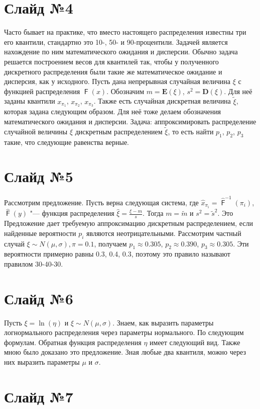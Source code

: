 \documentclass[specialist, substylefile = spbu.rtx,
subf,href,colorlinks=true, 12pt]{disser}
\DeclareMathOperator{\F}{\mathsf{F}}
\begin{document}
	\section*{Слайд №4}
Часто бывает на практике, что вместо настоящего распределения известны три его квантили, стандартно это 10-, 50- и 90-процентили. Задачей является нахождение по ним математического ожидания и дисперсии. Обычно задача решается построением весов для квантилей так, чтобы у полученного дискретного распределения были такие же математическое ожидание и дисперсия, как у исходного. Пусть дана непрерывная случайная величина $\xi$ с функцией распределения $\F(x)$. Обозначим $m = \mathbf E(\xi)$, $s^{2} = \mathbf D(\xi)$.
Для неё заданы квантили $x_{\pi_{1}}$, $x_{\pi_{2}}$, $x_{\pi_{3}}$. Также есть случайная дискретная величина $\tilde{\xi}$, которая задана следующим образом.
Для неё тоже делаем обозначения математического ожидания и дисперсии.
Задача: аппроксимировать распределение случайной величины $\xi$ дискретным распределением $\tilde{\xi}$, то есть найти $p_{1}$, $p_{2}$, $p_{3}$ такие, что следующие равенства верные.

\section*{Слайд №5}
Рассмотрим предложение. Пусть верна следующая система, где $\hat{x}_{\pi_{i}} = \hat{\F}^{-1}(\pi_{i})$, $\hat{\F}(y)$ "--- функция распределения $\displaystyle{\hat{\xi} = \frac{\xi-m}{s}}$. Тогда $m=\tilde{m}$ и $s^{2} = \tilde{s}^{2}$. Это Предложение дает требуемую аппроксимацию дискретным распределением, если найденные вероятности $p_{i}$ являются неотрицательными. Рассмотрим частный случай $\xi\sim N(\mu, \sigma), \pi = 0.1$, получаем $p_{1}\approx 0.305$, $p_{2}\approx 0.390$,  $p_{3}\approx 0.305$. Эти вероятности примерно равны 0.3, 0.4, 0.3, поэтому это правило называют правилом 30-40-30.

\section*{Слайд №6}

Пусть $\xi = \ln(\eta)$ и $\xi \sim N(\mu, \sigma)$. Знаем, как выразить параметры логнормального распределения через параметры нормального. По следующим формулам. Обратная функция распределения $\eta$ имеет следующий вид. Также мною было доказано это предложение. Зная любые два квантиля, можно через них выразить параметры $\mu$ и $\sigma$.

\section*{Слайд №7}
\end{document}
